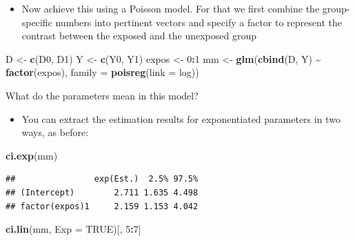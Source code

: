 \documentclass[
]{book}
\newenvironment{Shaded}{\begin{snugshade}}{\end{snugshade}}
\newcommand{\AttributeTok}[1]{\textcolor[rgb]{0.13,0.29,0.53}{#1}}
\newcommand{\ConstantTok}[1]{\textcolor[rgb]{0.56,0.35,0.01}{#1}}
\newcommand{\DecValTok}[1]{\textcolor[rgb]{0.00,0.00,0.81}{#1}}
\newcommand{\FunctionTok}[1]{\textcolor[rgb]{0.13,0.29,0.53}{\textbf{#1}}}
\newcommand{\NormalTok}[1]{#1}
\newcommand{\OtherTok}[1]{\textcolor[rgb]{0.56,0.35,0.01}{#1}}
\newcommand{\SpecialCharTok}[1]{\textcolor[rgb]{0.81,0.36,0.00}{\textbf{#1}}}
\providecommand{\tightlist}{%
  \setlength{\itemsep}{0pt}\setlength{\parskip}{0pt}}
\theoremstyle{definition}
\theoremstyle{definition}
\theoremstyle{definition}
\theoremstyle{definition}
\theoremstyle{remark}
\begin{document}
\begin{itemize}
\tightlist
\item
  Now achieve this using a Poisson model. For that we first combine
  the group-specific numbers into pertinent vectors and specify a factor to represent the contrast between the exposed and the unexposed group
\end{itemize}

\begin{Shaded}
\begin{Highlighting}[]
\NormalTok{D }\OtherTok{\textless{}{-}} \FunctionTok{c}\NormalTok{(D0, D1)}
\NormalTok{Y }\OtherTok{\textless{}{-}} \FunctionTok{c}\NormalTok{(Y0, Y1)}
\NormalTok{expos }\OtherTok{\textless{}{-}} \DecValTok{0}\SpecialCharTok{:}\DecValTok{1}
\NormalTok{mm }\OtherTok{\textless{}{-}} \FunctionTok{glm}\NormalTok{(}\FunctionTok{cbind}\NormalTok{(D, Y) }\SpecialCharTok{\textasciitilde{}} \FunctionTok{factor}\NormalTok{(expos), }\AttributeTok{family =} \FunctionTok{poisreg}\NormalTok{(}\AttributeTok{link =}\NormalTok{ log))}
\end{Highlighting}
\end{Shaded}

What do the parameters mean in this model?

\begin{itemize}
\tightlist
\item
  You can extract the estimation results for exponentiated parameters in two ways, as before:
\end{itemize}

\begin{Shaded}
\begin{Highlighting}[]
\FunctionTok{ci.exp}\NormalTok{(mm)}
\end{Highlighting}
\end{Shaded}

\begin{verbatim}
##                exp(Est.)  2.5% 97.5%
## (Intercept)        2.711 1.635 4.498
## factor(expos)1     2.159 1.153 4.042
\end{verbatim}

\begin{Shaded}
\begin{Highlighting}[]
\FunctionTok{ci.lin}\NormalTok{(mm, }\AttributeTok{Exp =} \ConstantTok{TRUE}\NormalTok{)[, }\DecValTok{5}\SpecialCharTok{:}\DecValTok{7}\NormalTok{]}
\end{Highlighting}
\end{Shaded}
\end{document}
